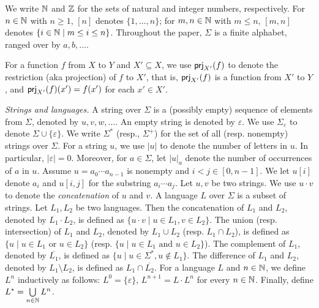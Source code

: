 %

We write $\mathbb{N}$ and $\mathbb{Z}$ for the sets of natural and integer numbers, respectively. For $n \in \mathbb{N}$ with $n \ge 1$, $[n]$ denotes $\{1, \ldots, n\}$; for $m,n \in \mathbb{N}$ with $m \le n$,  $[m, n]$ denotes $\{ i \in \mathbb{N} \mid m \le i \le n \}$. Throughout the paper, $\Sigma$ is a finite alphabet, ranged over by $a,b,\ldots$.  

For a function $f$ from $X$ to $Y$ and $X' \subseteq X$, we use ${\sf prj}_{X'}(f)$ to denote the restriction (aka projection) of $f$ to $X'$, that is, ${\sf prj}_{X'}(f)$ is a function from $X'$ to $Y$, and ${\sf prj}_{X'}(f)(x') = f(x')$ for each $x' \in X'$.

\medskip
\noindent \emph{Strings and languages.}
A string over $\Sigma$ is a (possibly empty) sequence of elements from $\Sigma$,
denoted by $u, v, w, \ldots$. An empty string is denoted by $\varepsilon$. We use $\Sigma_\varepsilon$ to denote $\Sigma \cup \{\varepsilon\}$. We write $\Sigma^*$ (resp., $\Sigma^+$) for the set of all (resp. nonempty) strings over $\Sigma$.
For a string $u$, we use $|u|$ to denote the number of letters in $u$. In particular, $|\varepsilon|=0$. 
Moreover, for $a \in \Sigma$, let $|u|_a$ denote the number of occurrences of $a$ in $u$. 
Assume $u=a_0\cdots a_{n-1}$ is nonempty and $i<j \in [0,n-1]$. %
We let $u[i]$ denote $a_i$ and $u[i,j]$ for the substring %
$a_i\cdots a_j$. 
%
Let $u, v$ be two strings. We use $u \cdot v$ to denote the \emph{concatenation} of $u$ and $v$. A language $L$ over $\Sigma$ is a subset of strings.  
Let $L_1, L_2$ be two languages. Then the concatenation of $L_1$ and $L_2$, denoted by $L_1 \cdot L_2$,  is defined as $\{u \cdot v \mid u \in L_1, v \in L_2\}$. The union (resp. intersection) of $L_1$ and $L_2$, denoted by $L_1 \cup L_2$  (resp. $L_1 \cap L_2$), is defined as $\{u \mid u \in L_1 \mbox{ or } u \in L_2\}$ (resp. $\{u \mid u \in L_1 \mbox{ and } u \in L_2\}$). The complement of $L_1$, denoted by $\overline{L_1}$, is defined as $\{u \mid u \in \Sigma^*, u \not \in L_1\}$. 
The difference of $L_1$ and $L_2$, denoted by $L_1 \setminus L_2$, is defined as $L_1 \cap \overline{L_2}$. 
For a language $L$ and $n \in \mathbb{N}$, we define $L^n$ inductively as follows: $L^0= \{\varepsilon\}$, $L^{n+1} = L \cdot L^n$ for every $n \in \mathbb{N}$. 
Finally, define $L^* = \bigcup \limits_{n \in \mathbb{N}} L^n$.

